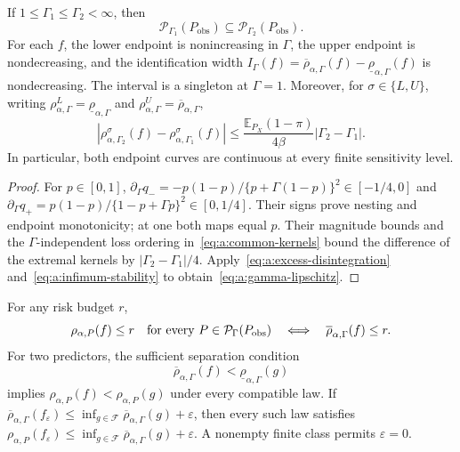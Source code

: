 \begin{proposition}
\label{prop:a:sensitivity}
If $1\leq\Gamma_1\leq\Gamma_2<\infty$, then
\[
\mathcal P_{\Gamma_1}(P_{\mathrm{obs}})\subseteq\mathcal P_{\Gamma_2}(P_{\mathrm{obs}}).
\]
For each $f$, the lower endpoint is nonincreasing in $\Gamma$, the upper endpoint is nondecreasing, and the identification width
$I_\Gamma(f)=\overline\rho_{\alpha,\Gamma}(f)-\underline\rho_{\alpha,\Gamma}(f)$ is nondecreasing. The interval is a singleton at $\Gamma=1$. Moreover, for $\sigma\in\{L,U\}$, writing $\rho^L_{\alpha,\Gamma}=\underline\rho_{\alpha,\Gamma}$ and $\rho^U_{\alpha,\Gamma}=\overline\rho_{\alpha,\Gamma}$,
\begin{equation}
|\rho^\sigma_{\alpha,\Gamma_2}(f)-\rho^\sigma_{\alpha,\Gamma_1}(f)|
\leq\frac{\mathbb E_{P_X}(1-\pi)}{4\beta}|\Gamma_2-\Gamma_1|.
\label{eq:a:gamma-lipschitz}
\end{equation}
In particular, both endpoint curves are continuous at every finite sensitivity level.
\end{proposition}

\begin{proof}
For $p\in[0,1]$, $\partial_\Gamma q_-=-p(1-p)/\{p+\Gamma(1-p)\}^2\in[-1/4,0]$ and $\partial_\Gamma q_+=p(1-p)/\{1-p+\Gamma p\}^2\in[0,1/4]$. Their signs prove nesting and endpoint monotonicity; at one both maps equal $p$. Their magnitude bounds and the $\Gamma$-independent loss ordering in~\eqref{eq:a:common-kernels} bound the difference of the extremal kernels by $|\Gamma_2-\Gamma_1|/4$. Apply~\eqref{eq:a:excess-disintegration} and~\eqref{eq:a:infimum-stability} to obtain~\eqref{eq:a:gamma-lipschitz}.
\end{proof}

\begin{corollary}
\label{cor:a:decisions}
For any risk budget $r$,
\begin{equation}
\rho_{\alpha,P}(f)\leq r\quad\hbox{for every }P\in\mathcal P_\Gamma(P_{\mathrm{obs}})
\quad\Longleftrightarrow\quad
\overline\rho_{\alpha,\Gamma}(f)\leq r.
\label{eq:a:risk-budget}
\end{equation}
For two predictors, the sufficient separation condition
\begin{equation}
\overline\rho_{\alpha,\Gamma}(f)<\underline\rho_{\alpha,\Gamma}(g)
\label{eq:a:dominance}
\end{equation}
implies $\rho_{\alpha,P}(f)<\rho_{\alpha,P}(g)$ under every compatible law. If $\overline\rho_{\alpha,\Gamma}(f_\varepsilon)\leq\inf_{g\in\mathcal F}\overline\rho_{\alpha,\Gamma}(g)+\varepsilon$, then every such law satisfies $\rho_{\alpha,P}(f_\varepsilon)\leq\inf_{g\in\mathcal F}\overline\rho_{\alpha,\Gamma}(g)+\varepsilon$. A nonempty finite class permits $\varepsilon=0$.
\end{corollary}


